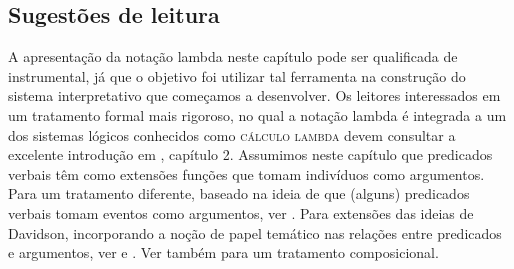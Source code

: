 \bigskip

\begin{tcolorbox}[parbox=false,boxrule=0pt,sharp corners,breakable]


\section*{Sugestões de leitura}

A apresentação da notação lambda neste capítulo pode ser qualificada de instrumental,
já que o objetivo foi utilizar tal ferramenta na construção
do sistema interpretativo que começamos a desenvolver. Os leitores interessados em um tratamento formal mais
rigoroso, no qual a notação lambda é integrada a um dos sistemas
lógicos conhecidos como \textsc{cálculo lambda} devem consultar a
excelente introdução em \cite{carpenter97}, capítulo 2. Assumimos neste capítulo que predicados verbais têm como extensões funções que tomam indivíduos como argumentos. Para um tratamento diferente, baseado na ideia de que (alguns) predicados verbais tomam eventos como argumentos, ver \cite{davidson67}. Para extensões das ideias de Davidson, incorporando a noção de papel temático nas relações entre predicados e argumentos, ver \cite{parsons90} e \cite{schein93}. Ver também \cite{kratzer03} para um tratamento composicional.

\end{tcolorbox}


\bigskip

